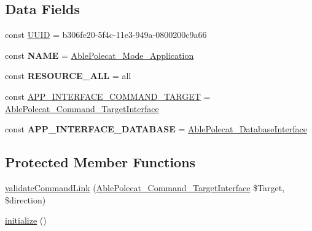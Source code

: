 \subsection*{Data Fields}
\begin{DoxyCompactItemize}
\item 
const \hyperlink{class_able_polecat___mode___application_a74b892c8c0b86bf9d04c5819898c51e7}{U\+U\+I\+D} = \textquotesingle{}b306fe20-\/5f4c-\/11e3-\/949a-\/0800200c9a66\textquotesingle{}
\item 
\hypertarget{class_able_polecat___mode___application_a244352f035b82b20b0efa506167fd862}{}const {\bfseries N\+A\+M\+E} = \textquotesingle{}\hyperlink{class_able_polecat___mode___application}{Able\+Polecat\+\_\+\+Mode\+\_\+\+Application}\textquotesingle{}\label{class_able_polecat___mode___application_a244352f035b82b20b0efa506167fd862}

\item 
\hypertarget{class_able_polecat___mode___application_a76ca3be78b6069232f9ad2abdc4f2b6e}{}const {\bfseries R\+E\+S\+O\+U\+R\+C\+E\+\_\+\+A\+L\+L} = \textquotesingle{}all\textquotesingle{}\label{class_able_polecat___mode___application_a76ca3be78b6069232f9ad2abdc4f2b6e}

\item 
const \hyperlink{class_able_polecat___mode___application_a37f6c7e337e857be96a70f2e31cadae1}{A\+P\+P\+\_\+\+I\+N\+T\+E\+R\+F\+A\+C\+E\+\_\+\+C\+O\+M\+M\+A\+N\+D\+\_\+\+T\+A\+R\+G\+E\+T} = \textquotesingle{}\hyperlink{interface_able_polecat___command___target_interface}{Able\+Polecat\+\_\+\+Command\+\_\+\+Target\+Interface}\textquotesingle{}
\item 
\hypertarget{class_able_polecat___mode___application_a780aab9b980f711c3e7b676a2137e042}{}const {\bfseries A\+P\+P\+\_\+\+I\+N\+T\+E\+R\+F\+A\+C\+E\+\_\+\+D\+A\+T\+A\+B\+A\+S\+E} = \textquotesingle{}\hyperlink{interface_able_polecat___database_interface}{Able\+Polecat\+\_\+\+Database\+Interface}\textquotesingle{}\label{class_able_polecat___mode___application_a780aab9b980f711c3e7b676a2137e042}

\end{DoxyCompactItemize}
\subsection*{Protected Member Functions}
\begin{DoxyCompactItemize}
\item 
\hyperlink{class_able_polecat___mode___application_a37906da60d0165610266b97b07bc5267}{validate\+Command\+Link} (\hyperlink{interface_able_polecat___command___target_interface}{Able\+Polecat\+\_\+\+Command\+\_\+\+Target\+Interface} \$Target, \$direction)
\item 
\hyperlink{class_able_polecat___mode___application_a91098fa7d1917ce4833f284bbef12627}{initialize} ()
\end{DoxyCompactItemize}
